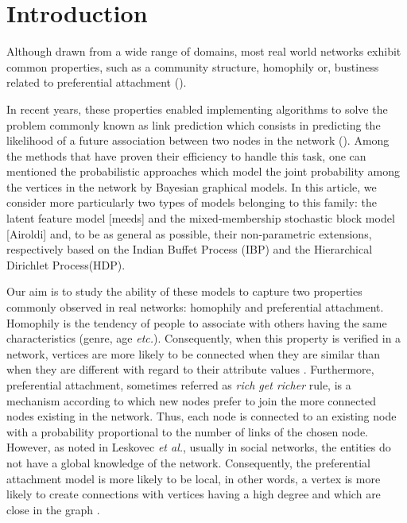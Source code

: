 \section{Introduction}
\label{sec:introduction}
Although drawn from a wide range of domains, most real world networks exhibit common properties, such as a community structure, homophily or,  bustiness related to  preferential attachment (\cite{Newman2010, Barabasi2003}).

In recent years, these properties enabled implementing algorithms to solve the  problem commonly known as link prediction which consists in predicting the likelihood of a future association between two nodes in the network (\cite{Liben-Nowell07, HassanZaki11}). Among the methods that have proven their efficiency to handle this task, one can mentioned the probabilistic approaches which model the joint probability among the vertices in the network by Bayesian graphical models. In this article, we consider more particularly two types of models belonging to this family: the latent feature model [meeds] and the mixed-membership stochastic block model [Airoldi] and, to be as general as possible, their non-parametric extensions, respectively based on the Indian Buffet Process (IBP) and the Hierarchical Dirichlet Process(HDP).
 
Our aim is to study the ability of these models to capture two properties commonly observed in real networks: homophily and preferential attachment.
Homophily is the tendency of people to associate with others having the same characteristics (genre, age \textit{etc.}).  Consequently, when this property is verified in a network,  vertices are more likely to be connected when they are similar than when they are different  with regard to their attribute values \cite{mcpherson2001birds}.  %
Furthermore,  preferential attachment, sometimes referred as \textit{rich get richer } rule,  is a mechanism  according to which new nodes prefer to join the more connected nodes existing in the network. Thus, each node is connected to an existing node with a probability proportional to
the number of links of the chosen node. However, as noted in Leskovec \textit{et al.}, usually in social networks, the entities do not have a global knowledge of the network. Consequently, the preferential attachment model is more likely to be local, in other words,  a vertex is more likely to create connections with vertices having a high degree and which are close in the graph \cite{LeskovecBKT08}.


